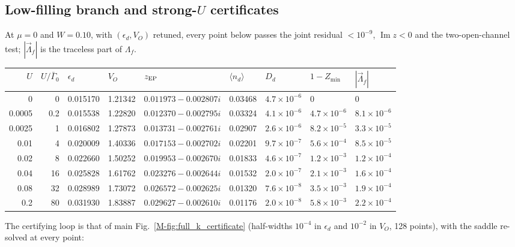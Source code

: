 \documentclass[%
  aps,physrev,onecolumn,10pt,amsmath,amssymb,superscriptaddress,longbibliography,floatfix
]{revtex4-2}
\begin{document}
\subsection{Low-filling branch and strong-\texorpdfstring{$U$}{U} certificates}
At $\mu=0$ and $W=0.10$, with $(\epsilon_d,V_O)$ retuned, every point below
passes the joint residual $<10^{-9}$, $\operatorname{Im}z<0$ and the
two-open-channel test; $|\vec\Lambda_f|$ is the traceless part of $\Lambda_f$.
\begin{center}
\begin{tabular}{@{}rrlllllll@{}}
\toprule
$U$ & $U/\bar\Gamma_0$ & $\epsilon_d$ & $V_O$ & $z_{\rm EP}$ & $\langle n_d\rangle$ & $D_d$ & $1-Z_{\min}$ & $|\vec\Lambda_f|$\\
\midrule
0      & 0    & 0.015170 & 1.21342 & $0.011973-0.002807i$ & 0.03468 & $4.7\times10^{-6}$ & 0 & 0\\
0.0005 & 0.2  & 0.015538 & 1.22820 & $0.012370-0.002795i$ & 0.03324 & $4.1\times10^{-6}$ & $4.7\times10^{-6}$ & $8.1\times10^{-6}$\\
0.0025 & 1    & 0.016802 & 1.27873 & $0.013731-0.002761i$ & 0.02907 & $2.6\times10^{-6}$ & $8.2\times10^{-5}$ & $3.3\times10^{-5}$\\
0.01   & 4    & 0.020009 & 1.40336 & $0.017153-0.002702i$ & 0.02201 & $9.7\times10^{-7}$ & $5.6\times10^{-4}$ & $8.5\times10^{-5}$\\
0.02   & 8    & 0.022660 & 1.50252 & $0.019953-0.002670i$ & 0.01833 & $4.6\times10^{-7}$ & $1.2\times10^{-3}$ & $1.2\times10^{-4}$\\
0.04   & 16   & 0.025828 & 1.61762 & $0.023276-0.002644i$ & 0.01532 & $2.0\times10^{-7}$ & $2.1\times10^{-3}$ & $1.6\times10^{-4}$\\
0.08   & 32   & 0.028989 & 1.73072 & $0.026572-0.002625i$ & 0.01320 & $7.6\times10^{-8}$ & $3.5\times10^{-3}$ & $1.9\times10^{-4}$\\
0.2    & 80   & 0.031930 & 1.83887 & $0.029627-0.002610i$ & 0.01176 & $2.0\times10^{-8}$ & $5.8\times10^{-3}$ & $2.2\times10^{-4}$\\
\bottomrule
\end{tabular}
\end{center}
The certifying loop is that of main Fig.~\ref{M-fig:full_k_certificate}
(half-widths $10^{-4}$ in $\epsilon_d$ and $10^{-2}$ in $V_O$, 128 points), with
the saddle re-solved at every point:
\end{document}
